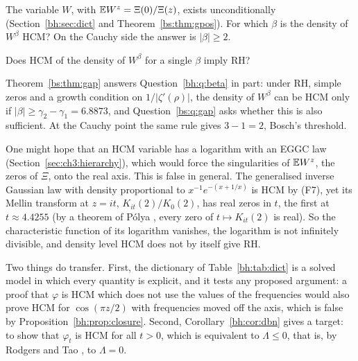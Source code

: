 \begin{question}\label{bh:q:beta}
The variable $W$, with $\mathbb{E} W^z=\Xi(0)/\Xi(z)$, exists unconditionally (Section~\ref{bh:sec:dict} and Theorem~\ref{bs:thm:gpos}). For which $\beta$ is the density of $W^\beta$ HCM? On the Cauchy side the answer is $|\beta|\ge2$.
\end{question}

\begin{question}\label{bh:q:single}
Does HCM of the density of $W^\beta$ for a single $\beta$ imply RH?
\end{question}

Theorem~\ref{bs:thm:gap} answers Question~\ref{bh:q:beta} in part: under RH, simple zeros and a growth condition on $1/|\zeta'(\rho)|$, the density of $W^\beta$ can be HCM only if $|\beta|\ge\gamma_2-\gamma_1=6.8873$, and Question~\ref{bs:q:gap} asks whether this is also sufficient. At the Cauchy point the same rule gives $3-1=2$, Bosch's threshold.

One might hope that an HCM variable has a logarithm with an EGGC law (Section~\ref{sec:ch3:hierarchy}), which would force the singularities of $\mathbb{E} W^z$, the zeros of $\Xi$, onto the real axis. This is false in general. The generalised inverse Gaussian law with density proportional to $x^{-1}e^{-(x+1/x)}$ is HCM by (F7), yet its Mellin transform at $z=it$, $K_{it}(2)/K_0(2)$, has real zeros in $t$, the first at $t\approx4.4255$ (by a theorem of P\'olya \cite{Polya}, every zero of $t\mapsto K_{it}(2)$ is real). So the characteristic function of its logarithm vanishes, the logarithm is not infinitely divisible, and density level HCM does not by itself give RH.

Two things do transfer. First, the dictionary of Table~\ref{bh:tab:dict} is a solved model in which every quantity is explicit, and it tests any proposed argument: a proof that $\varphi$ is HCM which does not use the values of the frequencies would also prove HCM for $\cos(\pi z/2)$ with frequencies moved off the axis, which is false by Proposition~\ref{bh:prop:closure}. Second, Corollary~\ref{bh:cor:dbn} gives a target: to show that $\varphi_t$ is HCM for all $t>0$, which is equivalent to $\Lambda\le0$, that is, by Rodgers and Tao \cite{RodgersTao}, to $\Lambda=0$.

